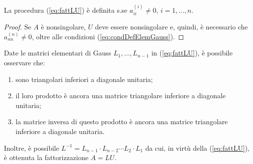 \begin{theorem}\label{th:condDefFattLU}
    La procedura (\ref{eq:fattLU}) è definita s.se $a_{ii}^{(i)}\neq 0,\, i=1,\hdots, n.$
\end{theorem}
\begin{proof}
    Se $A$ è nonsingolare, $U$ deve essere nonsingolare e, quindi, è necessario che $a_{nn}^{(n)}\neq 0$, oltre alle condizioni (\ref{eq:condDefElemGauss}).
\end{proof}

\begin{remark}
    Date le matrici elementari di Gauss $L_1, \hdots, L_{n-1}$ in (\ref{eq:fattLU}), è possibile osservare che:
\begin{enumerate}
    \item sono triangolari inferiori a diagonale unitaria;
    \item il loro prodotto è ancora una matrice triangolare inferiore a diagonale unitaria;
    \item la matrice inversa di questo prodotto è ancora una matrice triangolare inferiore a diagonale unitaria.
\end{enumerate}
Inoltre, è possibile $L^{-1}=L_{n-1}\cdot L_{n-2}\cdots L_2\cdot L_1$ da cui, in virtù della (\ref{eq:fattLU}), è ottenuta la fattorizzazione $A=LU$.
\end{remark}

